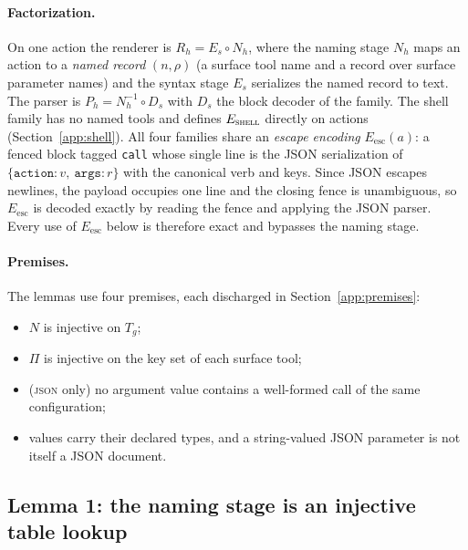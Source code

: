 \documentclass{article} %
\begin{document}
\paragraph{Factorization.} On one action the renderer is
$R_h = E_s\circ N_h$, where the naming stage $N_h$ maps an action to a
\emph{named record} $(n,\rho)$ (a surface tool name and a record over surface
parameter names) and the syntax stage $E_s$ serializes the named record to
text. The parser is $P_h = N_h^{-1}\circ D_s$ with $D_s$ the block decoder of
the family. The shell family has no named tools and defines $E_{\textsc{shell}}$
directly on actions (Section~\ref{app:shell}). All four families share an
\emph{escape encoding} $E_{\mathrm{esc}}(a)$: a fenced block tagged
\texttt{call} whose single line is the JSON serialization of
$\{\texttt{action}:v,\ \texttt{args}:r\}$ with the canonical verb and keys.
Since JSON escapes newlines, the payload occupies one line and the closing
fence is unambiguous, so $E_{\mathrm{esc}}$ is decoded exactly by reading the
fence and applying the JSON parser. Every use of $E_{\mathrm{esc}}$ below is
therefore exact and bypasses the naming stage.

\paragraph{Premises.} The lemmas use four premises, each discharged in
Section~\ref{app:premises}:
\begin{itemize}
\item[(P1)] $N$ is injective on $T_g$;
\item[(P2)] $\Pi$ is injective on the key set of each surface tool;
\item[(P3)] (\textsc{json} only) no argument value contains a well-formed call of
      the same configuration;
\item[(P4)] values carry their declared types, and a string-valued JSON
      parameter is not itself a JSON document.
\end{itemize}

\subsection{Lemma 1: the naming stage is an injective table lookup}
\label{app:naming}
\end{document}
